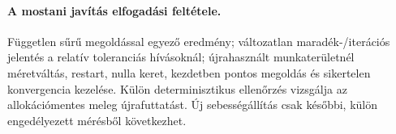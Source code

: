 \documentclass[11pt,a4paper]{article}
\begin{document}
\paragraph{A mostani javítás elfogadási feltétele.} Független sűrű megoldással
egyező eredmény; változatlan maradék-/iterációs jelentés a relatív toleranciás
hívásoknál; újrahasznált munkaterületnél méretváltás, restart, nulla keret,
kezdetben pontos megoldás és sikertelen konvergencia kezelése. Külön determinisztikus
ellenőrzés vizsgálja az allokációmentes meleg újrafuttatást. Új sebességállítás
csak későbbi, külön engedélyezett mérésből következhet.
\end{document}
